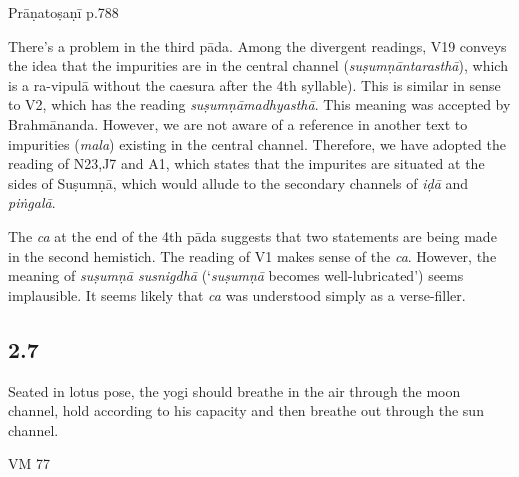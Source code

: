 \begin{ekdosis}
\begin{testimonia}[hp02_006]
Prāṇatoṣaṇī p.788

\begin{versinnote}
\end{versinnote}
\end{testimonia}

\begin{philcomm}[hp02_006]
There’s a problem in the third pāda. Among the divergent readings, V19 conveys the idea that the impurities are in the central channel  (\emph{suṣumṇāntarasthā}), which is a ra-vipulā without the caesura after the 4th syllable). This is similar in sense to V2, which has the reading \emph{suṣumṇāmadhyasthā}. This meaning was accepted by Brahmānanda. However, we are not aware of a reference in another text to impurities (\emph{mala}) existing in the central channel. Therefore, we have adopted the reading of N23,J7 and A1, which states that the impurites are situated at the sides of Suṣumṇā, which would allude to the secondary channels of \emph{iḍā} and \emph{piṅgalā}. 

The \emph{ca} at the end of the 4th pāda suggests that two statements are being made in the second hemistich. The reading of V1 makes sense of the \emph{ca}. However, the meaning of \emph{suṣumṇā susnigdhā} (`\emph{suṣumṇā} becomes well-lubricated') seems implausible. It seems likely that \emph{ca} was understood simply as a verse-filler.
\end{philcomm}

\subsection*{2.7}
\begin{translation}[hp02_007]
Seated in lotus pose, the yogi should breathe in the air through the moon channel, hold according to his capacity and then breathe out through the sun channel.
\end{translation}

\begin{sources}[hp02_007]
VM 77

\begin{versinnote}
\end{versinnote}
\end{sources}


\end{ekdosis}
